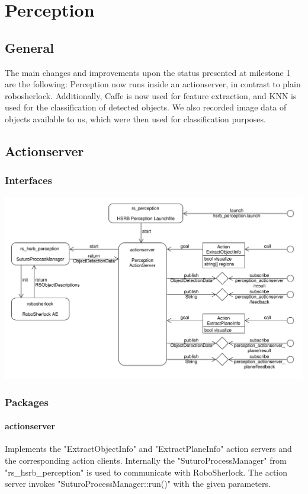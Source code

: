 \documentclass[main.tex]{subfiles}
\begin{document}
	
	\chapter{Perception}
		
		\section{General}
		The main changes and improvements upon the status presented at milestone 1 are the following: Perception now runs inside an actionserver, in contrast to 				plain robosherlock. Additionally, Caffe is now used for feature extraction, and KNN is used for the classification of detected objects. We also recorded 				image data of objects available to us, which were then used for classification purposes.
		
		\section{Actionserver}
			\subsection{Interfaces}
			\includegraphics[width=\textwidth]{../architecture/perception_architecture/perception.pdf}
			
			\subsection{Packages}
			\subsubsection{actionserver}
			Implements the "ExtractObjectInfo" and "ExtractPlaneInfo" action servers and the corresponding action clients.
			Internally the "SuturoProcessManager" from "rs\_hsrb\_perception" is used to communicate with RoboSherlock.
			The action server invokes "SuturoProcessManager::run()" with the given parameters. 
\end{document}
